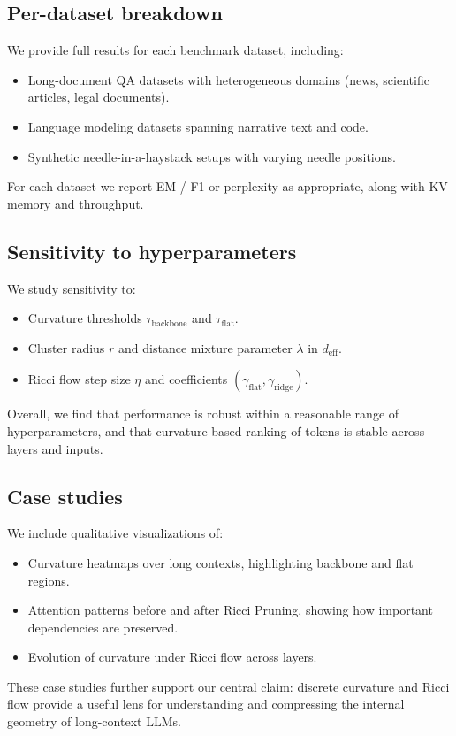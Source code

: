 \documentclass{article}
\theoremstyle{plain}
\theoremstyle{definition}
\theoremstyle{remark}
\begin{document}
\subsection{Per-dataset breakdown}

We provide full results for each benchmark dataset, including:

\begin{itemize}
  \item Long-document QA datasets with heterogeneous domains (news, scientific articles, legal documents).
  \item Language modeling datasets spanning narrative text and code.
  \item Synthetic needle-in-a-haystack setups with varying needle positions.
\end{itemize}

For each dataset we report EM / F1 or perplexity as appropriate, along with KV memory and throughput.

\subsection{Sensitivity to hyperparameters}

We study sensitivity to:

\begin{itemize}
  \item Curvature thresholds $\tau_\mathrm{backbone}$ and $\tau_\mathrm{flat}$.
  \item Cluster radius $r$ and distance mixture parameter $\lambda$ in $d_\mathrm{eff}$.
  \item Ricci flow step size $\eta$ and coefficients $(\gamma_\mathrm{flat},\gamma_\mathrm{ridge})$.
\end{itemize}

Overall, we find that performance is robust within a reasonable range of hyperparameters, and that curvature-based ranking of tokens is stable across layers and inputs.

\subsection{Case studies}

We include qualitative visualizations of:

\begin{itemize}
  \item Curvature heatmaps over long contexts, highlighting backbone and flat regions.
  \item Attention patterns before and after Ricci Pruning, showing how important dependencies are preserved.
  \item Evolution of curvature under Ricci flow across layers.
\end{itemize}

These case studies further support our central claim: discrete curvature and Ricci flow provide a useful lens for understanding and compressing the internal geometry of long-context LLMs.
\end{document}
